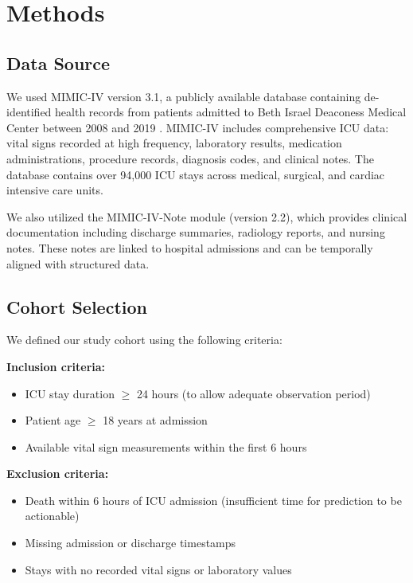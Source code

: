 \section{Methods}

\subsection{Data Source}

We used MIMIC-IV version 3.1, a publicly available database containing de-identified health records from patients admitted to Beth Israel Deaconess Medical Center between 2008 and 2019 \citep{Johnson2023}. MIMIC-IV includes comprehensive ICU data: vital signs recorded at high frequency, laboratory results, medication administrations, procedure records, diagnosis codes, and clinical notes. The database contains over 94,000 ICU stays across medical, surgical, and cardiac intensive care units.

We also utilized the MIMIC-IV-Note module (version 2.2), which provides clinical documentation including discharge summaries, radiology reports, and nursing notes. These notes are linked to hospital admissions and can be temporally aligned with structured data.

\subsection{Cohort Selection}

We defined our study cohort using the following criteria:

\textbf{Inclusion criteria:}
\begin{itemize}
    \item ICU stay duration $\geq$ 24 hours (to allow adequate observation period)
    \item Patient age $\geq$ 18 years at admission
    \item Available vital sign measurements within the first 6 hours
\end{itemize}

\textbf{Exclusion criteria:}
\begin{itemize}
    \item Death within 6 hours of ICU admission (insufficient time for prediction to be actionable)
    \item Missing admission or discharge timestamps
    \item Stays with no recorded vital signs or laboratory values
\end{itemize}

